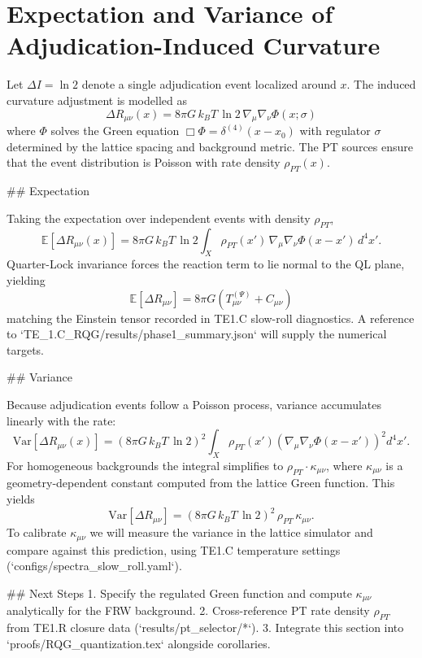 \section{Expectation and Variance of Adjudication-Induced Curvature}

Let $\Delta I = \ln 2$ denote a single adjudication event localized around $x$. The induced curvature adjustment is modelled as
\[
\Delta R_{\mu\nu}(x) = 8 \pi G \, k_B T \, \ln 2 \, \nabla_\mu \nabla_\nu \Phi(x; \sigma)
\]
where $\Phi$ solves the Green equation $\Box \Phi = \delta^{(4)}(x - x_0)$ with regulator $\sigma$ determined by the lattice spacing and background metric. The PT sources ensure that the event distribution is Poisson with rate density $\rho_{PT}(x)$.

## Expectation

Taking the expectation over independent events with density $\rho_{PT}$,
\[
\mathbb{E}[\Delta R_{\mu\nu}(x)] = 8 \pi G \, k_B T \, \ln 2 \int_X \rho_{PT}(x') \, \nabla_\mu \nabla_\nu \Phi(x - x') \, d^4 x'.
\]
Quarter-Lock invariance forces the reaction term to lie normal to the QL plane, yielding
\[
\mathbb{E}[\Delta R_{\mu\nu}] = 8 \pi G ( T^{(\Psi)}_{\mu\nu} + C_{\mu\nu} )
\]
matching the Einstein tensor recorded in TE1.C slow-roll diagnostics. A reference to `TE_1.C_RQG/results/phase1_summary.json` will supply the numerical targets.

## Variance

Because adjudication events follow a Poisson process, variance accumulates linearly with the rate:
\[
\mathrm{Var}[\Delta R_{\mu\nu}(x)] = ( 8 \pi G \, k_B T \, \ln 2 )^2 \int_X \rho_{PT}(x') \left( \nabla_\mu \nabla_\nu \Phi(x - x') \right)^2 d^4 x'.
\]
For homogeneous backgrounds the integral simplifies to $\rho_{PT} \cdot \kappa_{\mu\nu}$, where $\kappa_{\mu\nu}$ is a geometry-dependent constant computed from the lattice Green function. This yields
\[
\mathrm{Var}[\Delta R_{\mu\nu}] = ( 8 \pi G \, k_B T \, \ln 2 )^2 \, \rho_{PT} \, \kappa_{\mu\nu}.
\]
To calibrate $\kappa_{\mu\nu}$ we will measure the variance in the lattice simulator and compare against this prediction, using TE1.C temperature settings (`configs/spectra_slow_roll.yaml`).

## Next Steps
1. Specify the regulated Green function and compute $\kappa_{\mu\nu}$ analytically for the FRW background.
2. Cross-reference PT rate density $\rho_{PT}$ from TE1.R closure data (`results/pt_selector/*`).
3. Integrate this section into `proofs/RQG_quantization.tex` alongside corollaries.

